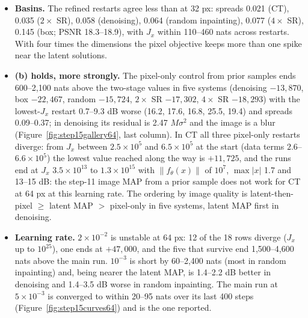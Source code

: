 \documentclass[11pt]{article}
\begin{document}
\begin{itemize}
        pattern returns: denoising (stage-1 residual 0.92) goes to 1.24
        and loses 3.3 dB with the log-determinant up 3,570 nats and the
        data term up from $-33$ to $+628$ against a noise level of 134;
        $4\times$ SR (0.95) goes to 1.97 and gains nothing.
  \item \textbf{Basins.} The refined restarts agree less than at 32 px:
        spreads 0.021 (CT), 0.035 ($2\times$ SR), 0.058 (denoising), 0.064
        (random inpainting), 0.077 ($4\times$ SR), 0.145 (box; PSNR
        18.3--18.9), with $J_x$ within 110--460 nats across restarts. With
        four times the dimensions the pixel objective keeps more than one
        spike near the latent solutions.
  \item \textbf{(b) holds, more strongly.} The pixel-only control from
        prior samples ends 600--2,100 nats above the two-stage values in
        five systems (denoising $-13{,}870$, box $-22{,}467$, random
        $-15{,}724$, $2\times$ SR $-17{,}302$, $4\times$ SR $-18{,}293$)
        with the lowest-$J_x$ restart 0.7--9.3 dB worse (16.2, 17.6, 16.8,
        25.5, 19.4) and spreads 0.09--0.37; in denoising its residual is 2.47
        $M\sigma^2$ and the image is a blur (Figure~\ref{fig:step15gallery64},
        last column). In CT all three pixel-only restarts diverge: from
        $J_x$ between $2.5 \times 10^{5}$ and $6.5 \times 10^{5}$ at the
        start (data terms $2.6$--$6.6 \times 10^{5}$) the lowest value
        reached along the way is $+11{,}725$, and the runs end at $J_x$
        $3.5 \times 10^{13}$ to $1.3 \times 10^{15}$ with $\|f_\theta(x)\|$
        of $10^{7}$, $\max|x|$ 1.7 and 13--15 dB: the step-11 image MAP
        from a prior sample does not work for CT at 64 px at this
        learning rate. The ordering by image quality is latent-then-pixel
        $\ge$ latent MAP $>$ pixel-only in five systems, latent MAP first
        in denoising.
  \item \textbf{Learning rate.} $2 \times 10^{-2}$ is unstable at 64 px:
        12 of the 18 rows diverge ($J_x$ up to $10^{25}$), one ends at
        $+47{,}000$, and the five that survive end 1,500--4,600 nats above
        the main run. $10^{-3}$
        is short by 60--2,400 nats (most in random inpainting) and, being
        nearer the latent MAP, is 1.4--2.2 dB better in denoising and
        1.4--3.5 dB worse in random inpainting. The main run at $5 \times
        10^{-3}$ is converged to within 20--95 nats over its last 400
        steps (Figure~\ref{fig:step15curves64}) and is the one reported.

\end{itemize}
\end{document}
